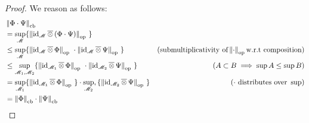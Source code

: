 \begin{proof}
  We reason as follows:
  \begin{equation*}
  \begin{split}
   & \cbnorm{\Phi \cdot \Psi}  \\
  & = \sup_{\mathscr{M}} \{ \opnorm{\id_\mathscr{M} \, \overline{\otimes} \, (\Phi \cdot \Psi)}\ \} \\
  & \leq \sup_{\mathscr{M}} \{ \opnorm{\id_\mathscr{M} \, \overline{\otimes} \, \Phi }\ \cdot  \opnorm{\id_\mathscr{M} \, \overline{\otimes} \,  \Psi}\ \} & (\text{submultiplicativity of} \opnorm{\cdot}  \text{w.r.t composition}) \\
  & \leq \sup_{\mathscr{M}_1, \mathscr{M}_2} \{ \opnorm{\id_{\mathscr{M}_1} \, \overline{\otimes} \, \Phi }\  \cdot  \opnorm{\id_{\mathscr{M}_2}\, \overline{\otimes} \,  \Psi}\ \} & (A \subset B \implies \sup A \leq \sup B) \\
  & = \sup_{\mathscr{M}_1} \{ \opnorm{\id_{\mathscr{M}_1} \, \overline{\otimes} \, \Phi }\ \} \cdot \sup_{\mathscr{M}_2}, \{ \opnorm{\id_{\mathscr{M}_2}\, \overline{\otimes} \,  \Psi}\ \} & (\cdot \text{  distributes over  } \sup)  \\
    & = \cbnorm{\Phi} \cdot  \cbnorm{\Psi} 
  \end{split}
  \end{equation*}

\end{proof}

